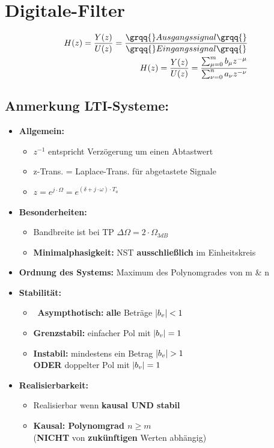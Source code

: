 \documentclass[10pt,a4paper]{article}
\begin{document}
\section{Digitale-Filter}
  \begin{mdframed}[style=exercise]
    \begin{align}
        H(z)=\frac{Y(z)}{U(z)}=\frac{\grqq{}Ausgangssignal\grqq{}}{\grqq{}Eingangssignal\grqq{}}\\
        H(z)=\frac{Y(z)}{U(z)}= \frac{\sum_{\mu=0}^{m} b_\mu z^{-\mu}}{\sum_{\nu=0}^{n} a_\nu z^{-\nu}}
    \end{align}
  \end{mdframed}

\subsection{Anmerkung LTI-Systeme:}
\begin{itemize}
    \item \textbf{Allgemein: }
    	\begin{itemize}
    	\item $z^{-1}$ entspricht Verzögerung um einen Abtastwert
    	\item z-Trans. = Laplace-Trans. für abgetastete Signale
    	\item $z = e^{j\cdot\Omega}=e^{(\delta + j \cdot \omega)\cdot T_a}$
    	\end{itemize}
    \item \textbf{Besonderheiten: }
    	\begin{itemize}
    	\item Bandbreite ist bei TP $\Delta \Omega = 2\cdot\Omega_{3dB}$ 
    	\item \textbf{Minimalphasigkeit: } NST \textbf{ausschließlich} im Einheitskreis
    	\end{itemize}
    \item \textbf{Ordnung des Systems: } Maximum des Polynomgrades von m \& n
    \item \textbf{Stabilität: }
    	\begin{itemize}
	\item \textbf{Asympthotisch:} \textbf{alle} Beträge $\abs{b_{v}}<1$
	\item \textbf{Grenzstabil:} einfacher Pol mit $\abs{b_{v}}=1$
	\item \textbf{Instabil:} mindestens ein Betrag $\abs{b_{v}}>1$\\
	\textbf{ODER} doppelter Pol mit $\abs{b_{v}}=1$
	\end{itemize}	
    \item \textbf{Realisierbarkeit: }
    	\begin{itemize}
    	\item Realisierbar wenn \textbf{kausal UND stabil}
    	\item \textbf{Kausal: Polynomgrad $n \geq m$}\\
    	(\textbf{NICHT} von \textbf{zukünftigen} Werten abhängig)
    	\end{itemize}
\end{itemize}  
\end{document}
